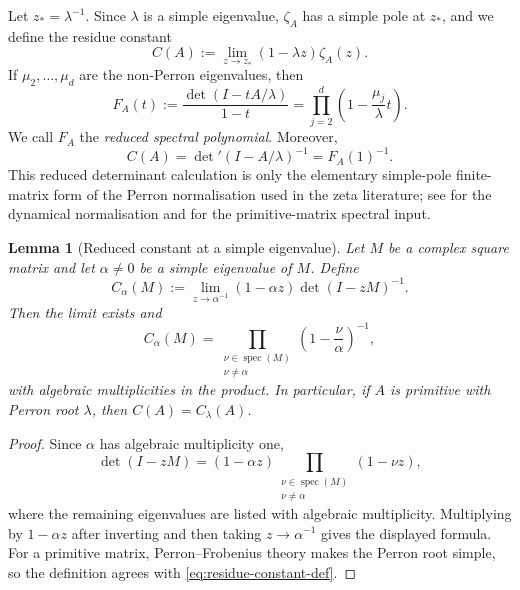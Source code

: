 \documentclass[11pt,a4paper]{amsart}
\theoremstyle{plain}
\newtheorem{lemma}[theorem]{Lemma}
\theoremstyle{definition}
\theoremstyle{remark}
\DeclareMathOperator{\spec}{spec}
\begin{document}
Let \(z_\ast=\lambda^{-1}\). Since \(\lambda\) is a simple eigenvalue,
\(\zeta_A\) has a simple pole at \(z_\ast\), and we define the residue
constant
\begin{equation}\label{eq:residue-constant-def}
  C(A):=\lim_{z\to z_\ast}(1-\lambda z)\zeta_A(z).
\end{equation}
If \(\mu_2,\dots,\mu_d\) are the non-Perron eigenvalues, then
\begin{equation}\label{eq:reduced-det-poly}
  F_A(t):=\frac{\det(I-tA/\lambda)}{1-t}
  =\prod_{j=2}^d\left(1-\frac{\mu_j}{\lambda}t\right).
\end{equation}
We call \(F_A\) the \emph{reduced spectral polynomial}. Moreover,
\begin{equation}\label{eq:reduced-det-constant}
  C(A)=\det\nolimits'(I-A/\lambda)^{-1}=F_A(1)^{-1}.
\end{equation}
This reduced determinant calculation is only the elementary simple-pole
finite-matrix form of the Perron normalisation used in the zeta literature;
see \cite{ParryPollicott1990Zeta} for the dynamical normalisation and
\cite{Seneta2006NonnegativeMatrices} for the primitive-matrix spectral input.

\begin{lemma}[Reduced constant at a simple eigenvalue]
  \label{lem:simple-eigenvalue-reduced-constant}
  Let \(M\) be a complex square matrix and let
  \(\alpha\neq 0\) be a simple eigenvalue of \(M\). Define
  \[
    C_\alpha(M)
    :=\lim_{z\to \alpha^{-1}}
      (1-\alpha z)\det(I-zM)^{-1}.
  \]
  Then the limit exists and
  \[
    C_\alpha(M)
    =
    \prod_{\substack{\nu\in\spec(M)\\ \nu\neq\alpha}}
      \left(1-\frac{\nu}{\alpha}\right)^{-1},
  \]
  with algebraic multiplicities in the product. In particular, if \(A\)
  is primitive with Perron root \(\lambda\), then
  \(C(A)=C_\lambda(A)\).
\end{lemma}

\begin{proof}
  Since \(\alpha\) has algebraic multiplicity one,
  \[
    \det(I-zM)
    =(1-\alpha z)
      \prod_{\substack{\nu\in\spec(M)\\ \nu\neq\alpha}}(1-\nu z),
  \]
  where the remaining eigenvalues are listed with algebraic
  multiplicity. Multiplying by \(1-\alpha z\) after inverting and then
  taking \(z\to \alpha^{-1}\) gives the displayed formula. For a
  primitive matrix, Perron--Frobenius theory
  \cite{Seneta2006NonnegativeMatrices} makes the Perron root simple, so the
  definition agrees with \eqref{eq:residue-constant-def}.
\end{proof}
\end{document}
